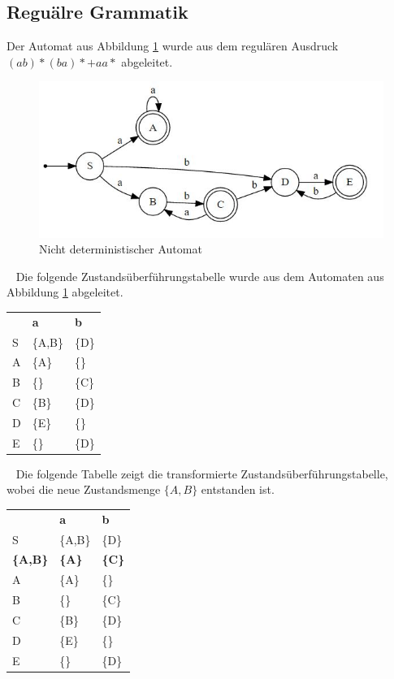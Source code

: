 \documentclass[11pt, a4paper, twoside]{article}   	%
\begin{document}
\subsection{Reguälre Grammatik}
Der Automat aus Abbildung \ref{fig:5-reg-state-machine} wurde aus dem regulären Ausdruck $(ab)*(ba)*+aa*$ abgeleitet.
\begin{figure}[h]
\centering
\includegraphics[scale=0.55]{transformed_regular_exp.JPG}
\caption{Nicht deterministischer Automat}
\label{fig:5-reg-state-machine}
\end{figure}
\ \newline
Die folgende Zustandsüberführungstabelle wurde aus dem Automaten aus Abbildung \ref{fig:5-reg-state-machine} abgeleitet.
\newline
\newline
\begin{tabularx}{10cm}{p{30pt} XX}
    & \textbf{a} & \textbf{b} \\
 S  & \{A,B\} & \{D\} \\
 A  & \{A\} & \{\} \\
 B  & \{\} & \{C\} \\
 C  & \{B\} & \{D\} \\
 D  & \{E\} & \{\} \\
 E  & \{\} & \{D\} \\
\end{tabularx}
\ \newline
\newline
\newline
\newline
Die folgende Tabelle zeigt die transformierte Zustandsüberführungstabelle, wobei die neue Zustandsmenge  $\{A,B\}$ entstanden ist.
\newline
\newline
\begin{tabularx}{10cm}{p{30pt} XX}
    & \textbf{a} & \textbf{b} \\
 S        & \{A,B\} & \{D\} \\
 \textbf{\{A,B\}}  &  \textbf{\{A\}} & \textbf{\{C\}} \\
 A        & \{A\} & \{\} \\
 B        & \{\} & \{C\} \\
 C        & \{B\} & \{D\} \\
 D        & \{E\} & \{\} \\
 E        & \{\} & \{D\} \\
\end{tabularx}
\end{document}
